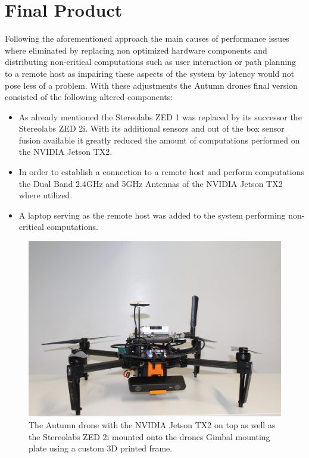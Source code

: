 \section{Final Product}
\label{sec:finalProduct}
Following the aforementioned approach the main causes of performance issues where eliminated by replacing non optimized hardware components and distributing non-critical computations such as user interaction or path planning to a remote host as impairing these aspects of the system by latency would not pose less of a problem. 
With these adjustments the Autumn drones final version consisted of the following altered components:
\begin{itemize}
	\item As already mentioned the Stereolabs ZED 1 was replaced by its successor the Stereolabs ZED 2i. With its additional sensors and out of the box sensor fusion available it greatly reduced the amount of computations performed on the NVIDIA Jetson TX2. 
	\item In order to establish a connection to a remote host and perform computations the Dual Band 2.4GHz and 5GHz Antennas of the NVIDIA Jetson TX2 where utilized. 
	\item A laptop serving as the remote host was added to the system performing non-critical computations.
\end{itemize}

\begin{figure}
	\centering
	\includegraphics[width=0.9\linewidth]{img/autumnDrone}
	\caption{
		The Autumn drone with the NVIDIA Jetson TX2 on top as well as the Stereolabs ZED 2i mounted onto the drones Gimbal mounting plate using a custom 3D printed frame. 
	}
	\label{fig:autumn}
\end{figure}


